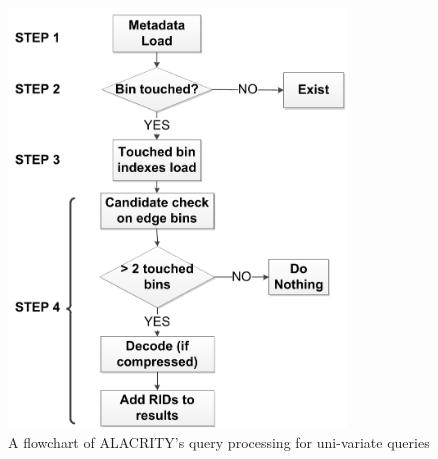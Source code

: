 \documentclass[11pt,a4paper]{article}
\newcommand{\alac}{ALACRITY}
\begin{document}
\begin{figure}[ht]             
\begin{center}                 
    \includegraphics[width=0.80\textwidth]{figures/uniquery-alac}
\end{center}
\caption{A flowchart of \alac's query processing for uni-variate queries}
\label{fig:alac-uniquery}  
\end{figure}
\end{document}
